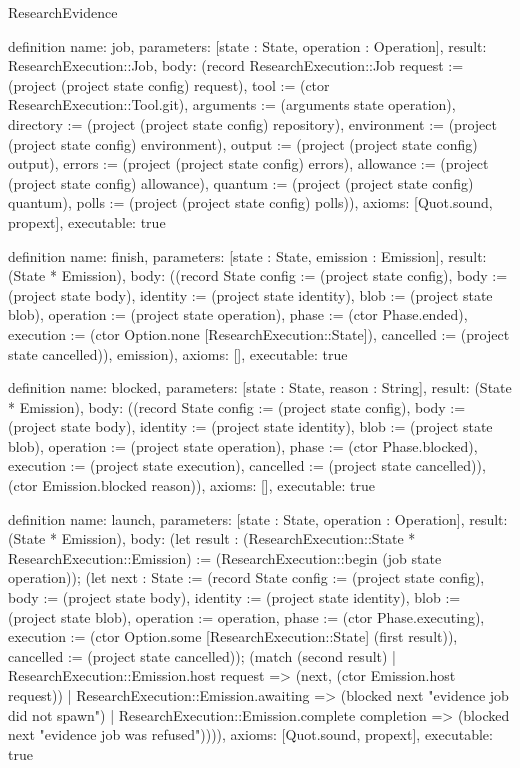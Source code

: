 \begin{lexlean}{ResearchEvidence}
\begin{semanticmodule}
definition{
 name: job,
 parameters: [state : State, operation : Operation],
 result: ResearchExecution::Job,
 body: (record ResearchExecution::Job {request := (project (project state config) request), tool := (ctor ResearchExecution::Tool.git), arguments := (arguments state operation), directory := (project (project state config) repository), environment := (project (project state config) environment), output := (project (project state config) output), errors := (project (project state config) errors), allowance := (project (project state config) allowance), quantum := (project (project state config) quantum), polls := (project (project state config) polls)}),
 axioms: [Quot.sound, propext],
 executable: true
}

definition{
 name: finish,
 parameters: [state : State, emission : Emission],
 result: (State * Emission),
 body: ((record State {config := (project state config), body := (project state body), identity := (project state identity), blob := (project state blob), operation := (project state operation), phase := (ctor Phase.ended), execution := (ctor Option.none [ResearchExecution::State]), cancelled := (project state cancelled)}), emission),
 axioms: [],
 executable: true
}

definition{
 name: blocked,
 parameters: [state : State, reason : String],
 result: (State * Emission),
 body: ((record State {config := (project state config), body := (project state body), identity := (project state identity), blob := (project state blob), operation := (project state operation), phase := (ctor Phase.blocked), execution := (project state execution), cancelled := (project state cancelled)}), (ctor Emission.blocked reason)),
 axioms: [],
 executable: true
}

definition{
 name: launch,
 parameters: [state : State, operation : Operation],
 result: (State * Emission),
 body: (let result : (ResearchExecution::State * ResearchExecution::Emission) := (ResearchExecution::begin (job state operation)); (let next : State := (record State {config := (project state config), body := (project state body), identity := (project state identity), blob := (project state blob), operation := operation, phase := (ctor Phase.executing), execution := (ctor Option.some [ResearchExecution::State] (first result)), cancelled := (project state cancelled)}); (match (second result) | ResearchExecution::Emission.host request => (next, (ctor Emission.host request)) | ResearchExecution::Emission.awaiting => (blocked next "evidence job did not spawn") | ResearchExecution::Emission.complete completion => (blocked next "evidence job was refused")))),
 axioms: [Quot.sound, propext],
 executable: true
}


\end{semanticmodule}
\end{lexlean}
